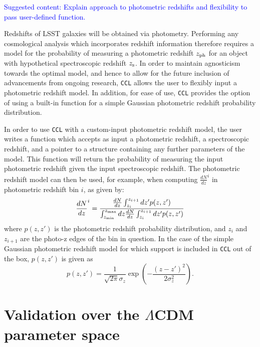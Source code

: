 \documentclass[\docopts]{\docclass}
\newcommand{\cont}[1]{\textcolor{blue}{Suggested content: #1}}
\newcommand{\ccl}{{\tt CCL}\xspace}
\begin{document}
\cont{Explain approach to photometric redshifts and flexibility to pass user-defined function.}

Redshifts of LSST galaxies will be obtained via photometry. Performing any cosmological analysis which incorporates redshift information therefore requires a model for the probability of measuring a photometric redshift $z_{\rm ph}$ for an object with hypothetical spectroscopic redshift $z_{\rm s}$.  In order to maintain agnosticism towards the optimal model, and hence to allow for the future inclusion of advancements from ongoing research, \ccl allows the user to flexibly input a photometric redshift model. In addition, for ease of use, \ccl provides the option of using a built-in function for a simple Gaussian photometric redshift probability distribution.

In order to use \ccl with a custom-input photometric redshift model, the user writes a function which accepts as input a photometric redshift, a spectroscopic redshift, and a pointer to a structure containing any further parameters of the model. This function will return the probability of measuring the input photometric redshift given the input spectroscopic redshift. The photometric redshift model can then be used, for example, when computing $\frac{dN}{dz}^i$ in photometric redshift bin $i$, as given by:
\begin{equation}
\frac{dN}{dz}^i = \frac{\frac{dN}{dz}\int_{z_i}^{z_{i+1}} dz' p(z,z')}{\int_{z_{\rm min}}^{z_{\rm max}}dz \frac{dN}{dz} \int_{z_i}^{z_{i+1}}dz' p(z, z')}
\label{photoz}
\end{equation}
where $p(z,z')$ is the photometric redshift probability distribution, and $z_{i}$ and $z_{i+1}$ are the photo-z edges of the bin in question. In the case of the simple Gaussian photometric redshift model for which support is included in \ccl out of the box, $p(z, z')$ is given as
\begin{equation}
p(z,z') = \frac{1}{\sqrt{2 \pi}\sigma_z} \exp\left(-\frac{(z-z')^2}{2\sigma_z^2}\right).
\label{pz_gauss}
\end{equation}



\section{Validation over the $\Lambda$CDM parameter space}

\end{document}
